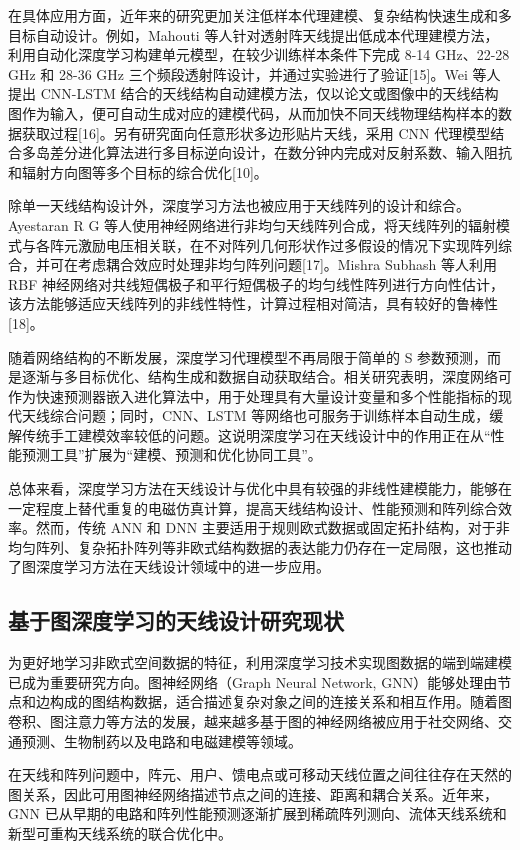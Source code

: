 \documentclass[UTF8,a4paper,12pt]{ctexart}
\begin{document}
在具体应用方面，近年来的研究更加关注低样本代理建模、复杂结构快速生成和多目标自动设计。例如，Mahouti 等人针对透射阵天线提出低成本代理建模方法，利用自动化深度学习构建单元模型，在较少训练样本条件下完成 8-14 GHz、22-28 GHz 和 28-36 GHz 三个频段透射阵设计，并通过实验进行了验证[15]。Wei 等人提出 CNN-LSTM 结合的天线结构自动建模方法，仅以论文或图像中的天线结构图作为输入，便可自动生成对应的建模代码，从而加快不同天线物理结构样本的数据获取过程[16]。另有研究面向任意形状多边形贴片天线，采用 CNN 代理模型结合多岛差分进化算法进行多目标逆向设计，在数分钟内完成对反射系数、输入阻抗和辐射方向图等多个目标的综合优化[10]。

除单一天线结构设计外，深度学习方法也被应用于天线阵列的设计和综合。Ayestaran R G 等人使用神经网络进行非均匀天线阵列合成，将天线阵列的辐射模式与各阵元激励电压相关联，在不对阵列几何形状作过多假设的情况下实现阵列综合，并可在考虑耦合效应时处理非均匀阵列问题[17]。Mishra Subhash 等人利用 RBF 神经网络对共线短偶极子和平行短偶极子的均匀线性阵列进行方向性估计，该方法能够适应天线阵列的非线性特性，计算过程相对简洁，具有较好的鲁棒性[18]。

随着网络结构的不断发展，深度学习代理模型不再局限于简单的 S 参数预测，而是逐渐与多目标优化、结构生成和数据自动获取结合。相关研究表明，深度网络可作为快速预测器嵌入进化算法中，用于处理具有大量设计变量和多个性能指标的现代天线综合问题；同时，CNN、LSTM 等网络也可服务于训练样本自动生成，缓解传统手工建模效率较低的问题。这说明深度学习在天线设计中的作用正在从“性能预测工具”扩展为“建模、预测和优化协同工具”。

总体来看，深度学习方法在天线设计与优化中具有较强的非线性建模能力，能够在一定程度上替代重复的电磁仿真计算，提高天线结构设计、性能预测和阵列综合效率。然而，传统 ANN 和 DNN 主要适用于规则欧式数据或固定拓扑结构，对于非均匀阵列、复杂拓扑阵列等非欧式结构数据的表达能力仍存在一定局限，这也推动了图深度学习方法在天线设计领域中的进一步应用。

\subsection{基于图深度学习的天线设计研究现状}

为更好地学习非欧式空间数据的特征，利用深度学习技术实现图数据的端到端建模已成为重要研究方向。图神经网络（Graph Neural Network, GNN）能够处理由节点和边构成的图结构数据，适合描述复杂对象之间的连接关系和相互作用。随着图卷积、图注意力等方法的发展，越来越多基于图的神经网络被应用于社交网络、交通预测、生物制药以及电路和电磁建模等领域。

在天线和阵列问题中，阵元、用户、馈电点或可移动天线位置之间往往存在天然的图关系，因此可用图神经网络描述节点之间的连接、距离和耦合关系。近年来，GNN 已从早期的电路和阵列性能预测逐渐扩展到稀疏阵列测向、流体天线系统和新型可重构天线系统的联合优化中。
\end{document}

